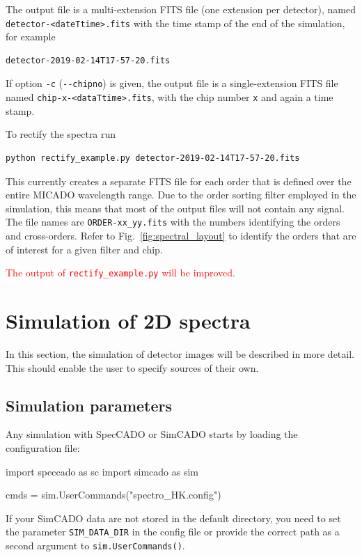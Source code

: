 \documentclass[a4paper,twoside,11pt]{article}
\begin{document}
The output file is a multi-extension FITS file (one extension per
detector), named \lstinline{detector-<dateTtime>.fits} with the time
stamp of the end of the simulation, for example
\begin{lstlisting}[style=csh]
detector-2019-02-14T17-57-20.fits
\end{lstlisting}
If option \lstinline{-c} (\lstinline{--chipno}) is given, the output
file is a single-extension FITS file named
\lstinline{chip-x-<dataTtime>.fits}, with the chip number
\lstinline{x} and again a time stamp.

To rectify the spectra run
\begin{lstlisting}[style=csh]
python rectify_example.py detector-2019-02-14T17-57-20.fits
\end{lstlisting}
This currently creates a separate FITS file for each order that is
defined over the entire MICADO wavelength range. Due to the order
sorting filter employed in the simulation, this means that most of the
output files will not contain any signal. The file names are
\lstinline{ORDER-xx_yy.fits} with the numbers identifying the orders
and cross-orders. Refer to Fig.~\ref{fig:spectral_layout} to identify
the orders that are of interest for a given filter and chip.

\textcolor{red}{The output of \lstinline{rectify_example.py} will be
  improved.}


\section{Simulation of 2D spectra}
\label{sec:simulation}

In this section, the simulation of detector images will be described
in more detail. This should enable the user to specify sources of
their own.

\subsection{Simulation parameters}
\label{ssec:simulation_parameters}

Any simulation with SpecCADO or SimCADO starts by loading the
configuration file:
\begin{pyin}
import speccado as sc
import simcado as sim

cmds = sim.UserCommands("spectro_HK.config")
\end{pyin}
If your SimCADO data are not stored in the default directory, you need
to set the parameter \lstinline{SIM_DATA_DIR} in the config file or
provide the correct path as a second argument to
\lstinline{sim.UserCommands()}.
\end{document}
